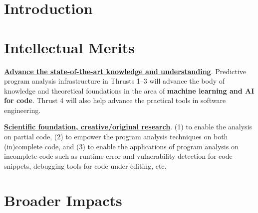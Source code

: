 \section{Introduction}
\label{sec:intro}









\section{Intellectual Merits}


\noindent \underline{{\bf Advance the state-of-the-art knowledge and
    understanding}}. Predictive program analysis infrastructure in Thrusts
1--3 will advance the body of knowledge and theoretical foundations
in the area of {\bf machine learning and AI for code}. Thrust 4 will also help advance the practical tools in software engineering.

\noindent \underline{{\bf Scientific foundation, creative/original
    research}}. (1) to enable the analysis on partial code, (2) to empower
the program analysis techniques on both (in)complete code,
and (3) to enable the applications of program analysis on incomplete
code such as runtime error and vulnerability detection for code snippets, debugging tools for code under editing, etc.

\section{Broader Impacts}

